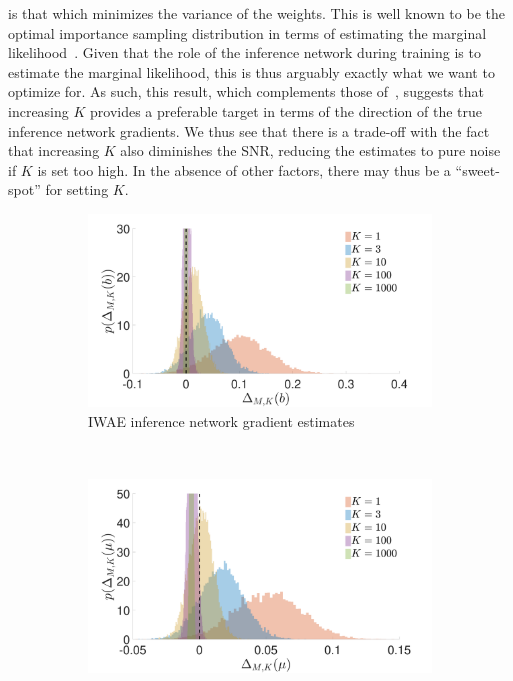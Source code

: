 is that which minimizes the variance of the weights.  This is well known to be 
the optimal importance sampling
distribution in terms of estimating the marginal likelihood~\citep{mcbook}.
Given that the role of the inference network during training is to estimate the
marginal likelihood, this is thus arguably exactly what we want to optimize for.  
As such, this result, which complements those
of~\cite{cremer2017reinterpreting}, suggests that increasing 
$K$ provides a preferable target in terms of the direction of the
true inference network gradients.  We thus see that there is a trade-off with the fact that increasing $K$ also diminishes
the \gls{SNR}, reducing the estimates to pure noise if $K$ is
set too high.   In the absence of other factors, there may thus be a ``sweet-spot'' for 
setting $K$.

\begin{figure}[t]
	\centering
	\begin{subfigure}[b]{0.4\textwidth}
		\centering
		\includegraphics[width=\textwidth]{figures/tighter_bounds/b_hist_IWAE} %
		\caption{ \gls{IWAE} inference network gradient estimates \label{fig:snr/b_hist_iwae}}
	\end{subfigure} ~~~~~~~~~~~~~
	\begin{subfigure}[b]{0.4\textwidth}
		\centering
		\includegraphics[width=\textwidth]{figures/tighter_bounds/mu_hist_IWAE} %

\end{subfigure}
\end{figure}
